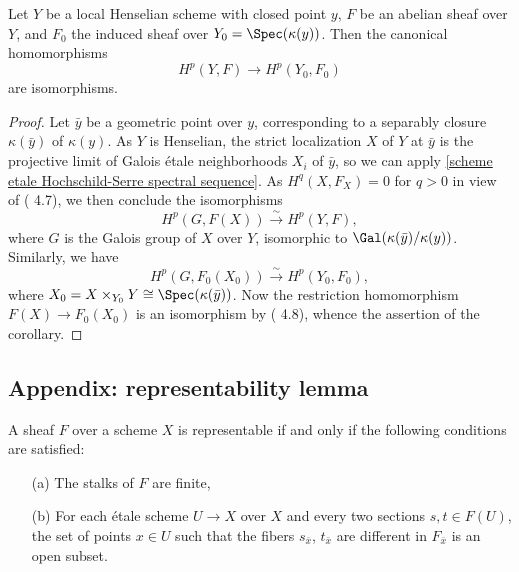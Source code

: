 \begin{corollary}\label{scheme local Henselian etale cohomology to closed point}
Let $Y$ be a local Henselian scheme with closed point $y$, $F$ be an abelian sheaf over $Y$, and $F_0$ the induced sheaf over $Y_0=\Spec(\kappa(y))$. Then the canonical homomorphisms
\[H^p(Y,F)\to H^p(Y_0,F_0)\]
are isomorphisms.
\end{corollary}
\begin{proof}
Let $\bar{y}$ be a geometric point over $y$, corresponding to a separably closure $\kappa(\bar{y})$ of $\kappa(y)$. As $Y$ is Henselian, the strict localization $X$ of $Y$ at $\bar{y}$ is the projective limit of Galois \'etale neighborhoods $X_i$ of $\bar{y}$, so we can apply \cref{scheme etale Hochschild-Serre spectral sequence}. As $H^q(X,F_X)=0$ for $q>0$ in view of (\cite{SGA4-2}  4.7), we then conclude the isomorphisms
\[H^p(G,F(X)) \stackrel{\sim}{\to} H^p(Y,F),\]
where $G$ is the Galois group of $X$ over $Y$, isomorphic to $\Gal(\kappa(\bar{y})/\kappa(y))$. Similarly, we have
\[H^p(G,F_0(X_0)) \stackrel{\sim}{\to} H^p(Y_0,F_0),\]
where $X_0=X\times_{Y_0}Y\cong\Spec(\kappa(\bar{y}))$. Now the restriction homomorphism $F(X)\to F_0(X_0)$ is an isomorphism by (\cite{SGA4-2}  4.8), whence the assertion of the corollary.
\end{proof}
\subsection{Appendix: representability lemma}
\begin{lemma}\label{scheme etale representability lemma}
A sheaf $F$ over a scheme $X$ is representable if and only if the following conditions are satisfied:
\begin{enumerate}
    \item[(a)] The stalks of $F$ are finite,
    \item[(b)] For each \'etale scheme $U\to X$ over $X$ and every two sections $s,t\in F(U)$, the set of points $x\in U$ such that the fibers $s_{\bar{x}}$, $t_{\bar{x}}$ are different in $F_{\bar{x}}$ is an open subset.
\end{enumerate}
\end{lemma}

